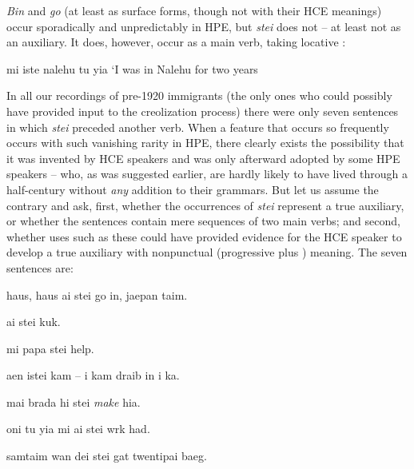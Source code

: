 \textit{Bin} and \textit{go} (at least as surface forms, though not with their HCE meanings) occur sporadically and unpredictably in HPE, but \textit{stei} does not -- at least not as an auxiliary. It does, however, occur as a main verb, taking locative :

\ea\label{ex:44}
 mi iste nalehu tu yia
\glt `I was in Nalehu for two years
\z

\noindent In all our recordings of pre-1920 immigrants (the only ones who could possibly have provided input to the creolization process) there were only seven sentences in which \textit{stei} preceded another verb. When a feature that occurs so frequently  occurs with such vanishing rarity in HPE, there clearly exists the possibility that it was invented by HCE speakers and was only afterward adopted by some HPE speakers -- who, as was suggested earlier, are hardly likely to have lived through a half-century without \textit{any} addition to their grammars. But let us assume the contrary and ask, first, whether the occurrences of \textit{stei} represent
% 
a true auxiliary, or whether the sentences contain mere sequences of two main verbs; and second, whether uses such as these could have provided evidence for the HCE speaker to develop a true auxiliary with nonpunctual (progressive plus ) meaning. The seven sentences are:

\ea\label{ex:45}
 haus, haus ai stei go in, jaepan taim.
\z

\ea\label{ex:46}
 ai stei kuk.
\z

\ea\label{ex:47}
 mi papa stei help.
\z

\ea\label{ex:48}
 aen istei kam -- i kam draib in i ka.
\z

\ea\label{ex:49}
 mai brada hi stei \textit{make} hia.
\z

\ea\label{ex:50}
oni tu yia mi ai stei wrk had.
\z

\ea\label{ex:51}
samtaim wan dei stei gat twentipai baeg.
\z

